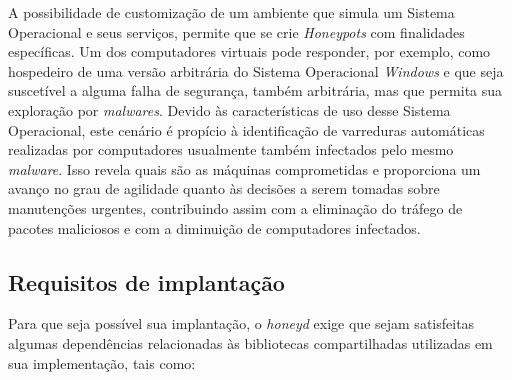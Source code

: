 A possibilidade de customização de um ambiente que simula um Sistema Operacional e seus serviços, permite que se crie \textit{Honeypots} com finalidades específicas. Um dos computadores virtuais pode responder, por exemplo, como hospedeiro de uma versão arbitrária do Sistema Operacional \textit{Windows} e que seja suscetível a alguma falha de segurança, também arbitrária, mas que permita sua exploração por \textit{malwares}. Devido às características de uso desse Sistema Operacional, este cenário é propício à identificação de varreduras automáticas realizadas por computadores usualmente também infectados pelo mesmo \textit{malware}. Isso revela quais são as máquinas comprometidas e proporciona um avanço no grau de agilidade quanto às decisões a serem tomadas sobre manutenções urgentes, contribuindo assim com a eliminação do tráfego de pacotes maliciosos e com a diminuição de computadores infectados.


\subsection{Requisitos de implantação}

Para que seja possível sua implantação, o \textit{honeyd} exige que sejam satisfeitas algumas dependências relacionadas às bibliotecas compartilhadas utilizadas em sua implementação, tais como:

